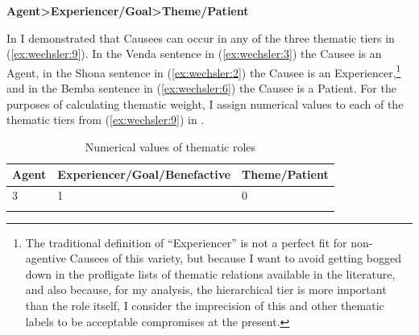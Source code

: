 \documentclass[output=paper,modfonts,nonflat]{langsci/langscibook}
\begin{document}
\ea\label{ex:wechsler:9}
\textbf{Agent>Experiencer/Goal>Theme/Patient}\\
\z

In  I demonstrated that Causees can occur in any of the three thematic tiers in (\ref{ex:wechsler:9}). In the Venda sentence in (\ref{ex:wechsler:3}) the Causee is an Agent, in the Shona sentence in (\ref{ex:wechsler:2}) the Causee is an Experiencer,\footnote{The traditional definition of “Experiencer” is not a perfect fit for non-agentive Causees of this variety, but because I want to avoid getting bogged down in the profligate lists of thematic relations available in the literature, and also because, for my analysis, the hierarchical tier is more important than the role itself, I consider the imprecision of this and other thematic labels to be acceptable compromises at the present.}  and in the Bemba sentence in (\ref{ex:wechsler:6}) the Causee is a Patient. For the purposes of calculating thematic weight, I assign numerical values to each of the thematic tiers from (\ref{ex:wechsler:9}) in . 

\begin{table}
\begin{tabularx}{\textwidth}{Xll}
\lsptoprule
 Agent & Experiencer/Goal/Benefactive & Theme/Patient\\
 \midrule
 3 & 1 & 0\\
\lspbottomrule
\end{tabularx}
\caption{Numerical values of thematic roles}
\label{tab:wechsler:1}
\end{table}
\end{document}
